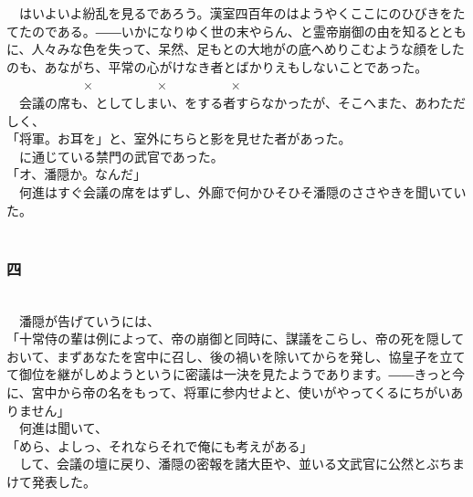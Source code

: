 \documentclass[
  paper=a5,
  fontsize=10pt,
  jafontsize=9.5pt,
  tate,                  %
  open_bracket_pos=nibu, %
]{jlreq}
\begin{document}
　はいよいよ紛乱を見るであろう。漢室四百年のはようやくここにのひびきをたてたのである。――いかになりゆく世の末やらん、と霊帝崩御の由を知るとともに、人々みな色を失って、呆然、足もとの大地がの底へめりこむような顔をしたのも、あながち、平常の心がけなき者とばかりえもしないことであった。\\


　　　　　　×　　　　　×　　　　　×\\


　会議の席も、としてしまい、をする者すらなかったが、そこへまた、あわただしく、\\


「将軍。お耳を」と、室外にちらと影を見せた者があった。\\


　に通じている禁門の武官であった。\\


「オ、潘隠か。なんだ」\\


　何進はすぐ会議の席をはずし、外廊で何かひそひそ潘隠のささやきを聞いていた。\\

\\

\subsubsection{四}

\\


　潘隠が告げていうには、\\


「十常侍の輩は例によって、帝の崩御と同時に、謀議をこらし、帝の死を隠しておいて、まずあなたを宮中に召し、後の禍いを除いてからを発し、協皇子を立てて御位を継がしめようというに密議は一決を見たようであります。――きっと今に、宮中から帝の名をもって、将軍に参内せよと、使いがやってくるにちがいありません」\\


　何進は聞いて、\\


「めら、よしっ、それならそれで俺にも考えがある」\\


　して、会議の壇に戻り、潘隠の密報を諸大臣や、並いる文武官に公然とぶちまけて発表した。\\
\end{document}
